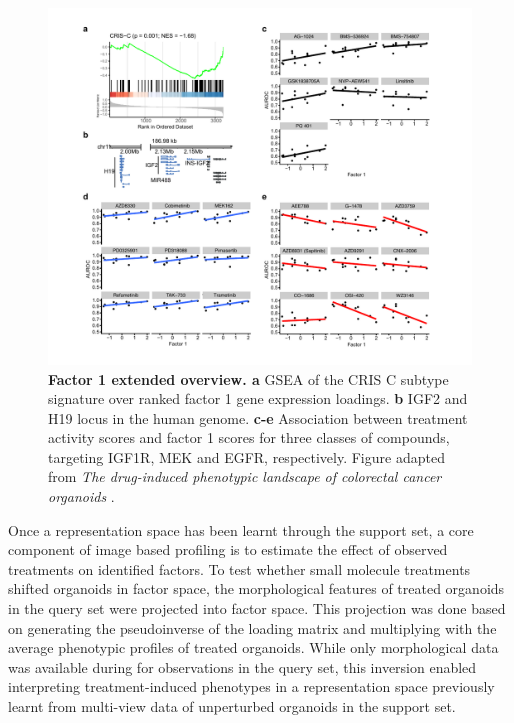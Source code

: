 \begin{flushleft}
\begin{figure}[h!]
\centering
\includegraphics[width=\textwidth,
                height=\textheight,
                keepaspectratio]{figures/promise/pdf/fig_6_2.pdf}
\caption[Factor 1 extended overview]{\textbf{Factor 1 extended overview. a} GSEA of the CRIS C subtype signature over ranked factor 1 gene expression loadings. \textbf{b} IGF2 and H19 locus in the human genome. \textbf{c-e} Association between treatment activity scores and factor 1 scores for three classes of compounds, targeting IGF1R, MEK and EGFR, respectively. Figure adapted from \textit{The drug-induced phenotypic landscape of colorectal cancer organoids} \cite{Betge2022-kr}.}
\label{fig_262}
\end{figure}

\bigbreak
Once a representation space has been learnt through the support set, a core component of image based profiling is to estimate the effect of observed treatments on identified factors. To test whether small molecule treatments shifted organoids in factor space, the morphological features of treated organoids in the query set were projected into factor space. This projection was done based on generating the pseudoinverse of the loading matrix and multiplying with the average phenotypic profiles of treated organoids. While only morphological data was available during for observations in the query set, this inversion enabled interpreting treatment-induced phenotypes in a representation space previously learnt from multi-view data of unperturbed organoids in the support set. 


\end{flushleft}
